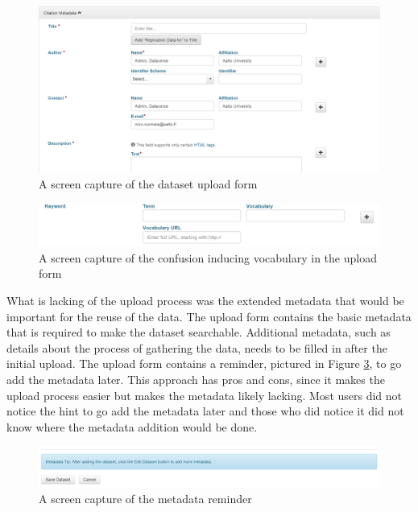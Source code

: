 \begin{figure}
    \begin{centering}
        \includegraphics[width=\textwidth]{images/upload}
    \end{centering}
    \caption{A screen capture of the dataset upload form}
    \label{fig:upload}
\end{figure}

\begin{figure}
    \begin{centering}
        \includegraphics[width=\textwidth]{images/vocabulary}
    \end{centering}
    \caption{A screen capture of the confusion inducing vocabulary in the upload form}
    \label{fig:vocabulary}
\end{figure}

What is lacking of the upload process was the extended metadata that would be
important for the reuse of the data. The upload form contains the basic
metadata that is required to make the dataset searchable. Additional metadata,
such as details about the process of gathering the data, needs to be filled in
after the initial upload. The upload form contains a reminder, pictured in
Figure \ref{fig:hint}, to go add the metadata later. This approach has pros and
cons, since it makes the upload process easier but makes the metadata likely
lacking. Most users did not notice the hint to go add the metadata later and
those who did notice it did not know where the metadata addition would be done.

\begin{figure}
    \begin{centering}
        \includegraphics[width=\textwidth]{images/hint}
    \end{centering}
    \caption{A screen capture of the metadata reminder}
    \label{fig:hint}
\end{figure}

